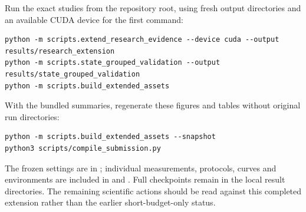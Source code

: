Run the exact studies from the repository root, using fresh output directories and an available CUDA device for the first command:
\begin{lstlisting}
python -m scripts.extend_research_evidence --device cuda --output results/research_extension
python -m scripts.state_grouped_validation --output results/state_grouped_validation
python -m scripts.build_extended_assets
\end{lstlisting}
With the bundled summaries, regenerate these figures and tables without original run directories:
\begin{lstlisting}
python -m scripts.build_extended_assets --snapshot
python3 scripts/compile_submission.py
\end{lstlisting}
The frozen settings are in ; individual measurements, protocols, curves and environments are included in  and . Full checkpoints remain in the local result directories. The remaining scientific actions should be read against this completed extension rather than the earlier short-budget-only status.
